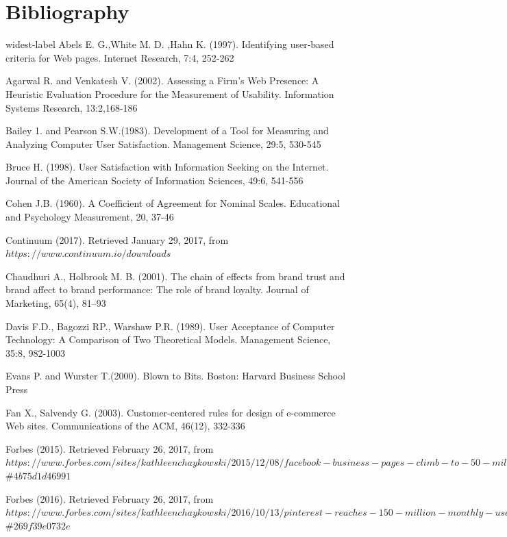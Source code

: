 \documentclass{article}
\begin{document}
\section{Bibliography}
\begin{thebibliography}{widest-label}
Abels E. G.,White M. D. ,Hahn K. (1997). Identifying user‐based criteria for Web pages. Internet Research, 7:4, 252-262

Agarwal R. and Venkatesh V. (2002). Assessing a Firm's Web Presence: A Heuristic Evaluation Procedure for the
Measurement of Usability. Information Systems Research, 13:2,168-186

Bailey 1. and Pearson S.W.(1983). Development of a Tool for Measuring and Analyzing Computer User Satisfaction.
Management Science, 29:5, 530-545

Bruce H. (1998). User Satisfaction with Information Seeking on the Internet. Journal of the American Society of Information Sciences, 49:6, 541-556

Cohen J.B. (1960). A Coefficient of Agreement for Nominal Scales. Educational and Psychology Measurement, 20,
37-46

Continuum (2017). Retrieved January 29, 2017, from $https://www.continuum.io/downloads$

Chaudhuri A., Holbrook M. B. (2001). The chain of effects from brand trust and brand affect to brand performance: The role of brand loyalty. Journal of Marketing, 65(4), 81–93

Davis F.D., Bagozzi RP., Warshaw P.R. (1989). User Acceptance of Computer Technology: A Comparison of
Two Theoretical Models. Management Science, 35:8, 982-1003

Evans P. and Wurster T.(2000). Blown to Bits. Boston: Harvard Business School Press

Fan X., Salvendy G. (2003). Customer-centered rules for design of e-commerce Web sites. Communications of the ACM, 46(12), 332-336

Forbes (2015). Retrieved February 26, 2017, from $https://www.forbes.com/sites/kathleenchaykowski/2015/12/08/facebook-business-pages-climb-to-50-million-with-new-messaging-tools/$\#$4b75d1d46991$

Forbes (2016). Retrieved February 26, 2017, from $https://www.forbes.com/sites/kathleenchaykowski/2016/10/13/pinterest-reaches-150-million-monthly-users/$\#$269f39e0732e$


\end{thebibliography}
\end{document}
